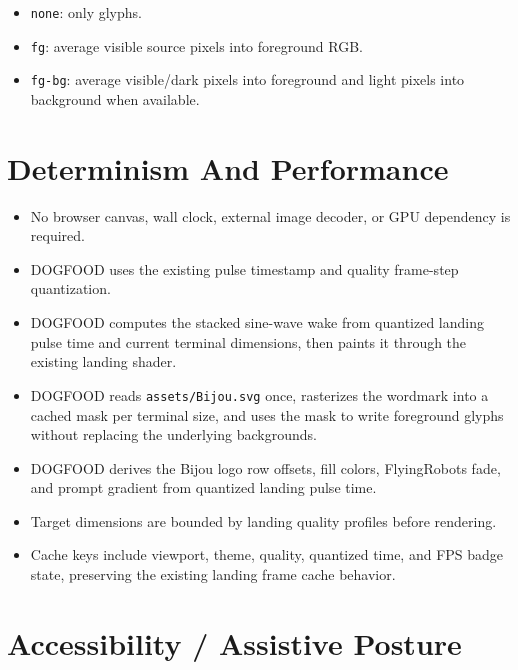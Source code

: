 \begin{itemize}
\tightlist
\item
  \texttt{n\allowbreak{}o\allowbreak{}n\allowbreak{}e}: only glyphs.
\item
  \texttt{f\allowbreak{}g}: average visible source pixels into foreground RGB.
\item
  \texttt{f\allowbreak{}g\allowbreak{}-\allowbreak{}b\allowbreak{}g}: average visible/dark pixels into foreground and light pixels into background when available.
\end{itemize}

\section{Determinism And Performance}\label{record-113-determinism-and-performance}

\begin{itemize}
\tightlist
\item
  No browser canvas, wall clock, external image decoder, or GPU dependency is required.
\item
  DOGFOOD uses the existing pulse timestamp and quality frame-step quantization.
\item
  DOGFOOD computes the stacked sine-wave wake from quantized landing pulse time and current terminal dimensions, then paints it through the existing landing shader.
\item
  DOGFOOD reads \texttt{a\allowbreak{}s\allowbreak{}s\allowbreak{}e\allowbreak{}t\allowbreak{}s\allowbreak{}/\allowbreak{}B\allowbreak{}i\allowbreak{}j\allowbreak{}o\allowbreak{}u\allowbreak{}.\allowbreak{}s\allowbreak{}v\allowbreak{}g} once, rasterizes the wordmark into a cached mask per terminal size, and uses the mask to write foreground glyphs without replacing the underlying backgrounds.
\item
  DOGFOOD derives the Bijou logo row offsets, fill colors, FlyingRobots fade, and prompt gradient from quantized landing pulse time.
\item
  Target dimensions are bounded by landing quality profiles before rendering.
\item
  Cache keys include viewport, theme, quality, quantized time, and FPS badge state, preserving the existing landing frame cache behavior.
\end{itemize}

\section{Accessibility / Assistive Posture}\label{record-113-accessibility-assistive-posture}


